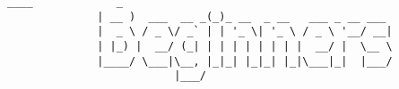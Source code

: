 \begin{center}
\begin{center}
\begin{lstlisting}[basicstyle=\ttfamily\large,frame=none]
               ____             _                                
              | __ )  ___  __ _(_)_ __  _ __   ___ _ __ ___      
              |  _ \ / _ \/ _` | | '_ \| '_ \ / _ \ '__/ __|     
              | |_) |  __/ (_| | | | | | | | |  __/ |  \__ \     
              |____/ \___|\__, |_|_| |_|_| |_|\___|_|  |___/     
                          |___/                                  
\end{lstlisting}
\end{center}

\fi

\vspace*{\fill}
\end{center}
